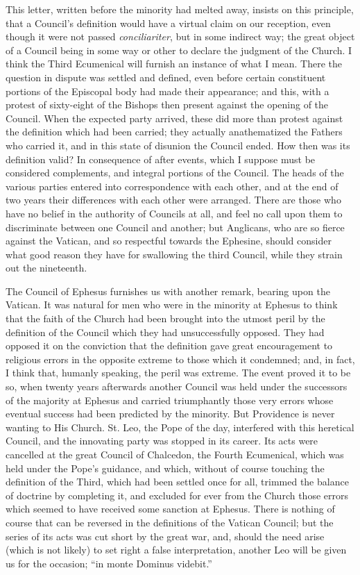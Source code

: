 This letter, written before the minority had melted away, insists on
this principle, that a Council's definition would have a virtual claim
on our reception, even though it were not passed \emph{conciliariter},
but in some indirect way; the great object of a Council being in some
way or other to declare the judgment of the Church. I think the Third
Ecumenical will furnish an instance of what I mean. There the question
in dispute was settled and defined, even before certain constituent
portions of the Episcopal body had made their appearance; and this, with
a protest of sixty-eight of the Bishops then present against the
opening of the Council. When the expected party arrived, these did more
than protest against the definition which had been carried; they
actually anathematized the Fathers who carried it, and in this state of
disunion the Council ended. How then was its definition valid? In
consequence of after events, which I suppose must be considered
complements, and integral portions of the Council. The heads of the
various parties entered into correspondence with each other, and at the
end of two years their differences with each other were arranged. There
are those who have no belief in the authority of Councils at all, and
feel no call upon them to discriminate between one Council and another;
but Anglicans, who are so fierce against the Vatican, and so respectful
towards the Ephesine, should consider what good reason they have for
swallowing the third Council, while they strain out the nineteenth.

The Council of Ephesus furnishes us with another remark, bearing upon
the Vatican. It was natural for men who were in the minority at Ephesus
to think that the faith of the Church had been brought into the utmost
peril by the definition of the Council which they had unsuccessfully
opposed. They had opposed it on the conviction that the definition gave
great encouragement to religious errors in the opposite extreme to those
which it condemned; and, in fact, I think that, humanly speaking, the
peril was extreme. The event proved it to be so, when twenty years
afterwards another Council was held under the successors of the majority
at Ephesus and carried triumphantly those very errors whose eventual
success had been predicted by the minority. But Providence is never wanting to His Church. St. Leo, the Pope of the day, interfered
with this heretical Council, and the innovating party was stopped in its
career. Its acts were cancelled at the great Council of Chalcedon, the
Fourth Ecumenical, which was held under the Pope's guidance, and which,
without of course touching the definition of the Third, which had been
settled once for all, trimmed the balance of doctrine by completing it,
and excluded for ever from the Church those errors which seemed to have
received some sanction at Ephesus. There is nothing of course that can
be reversed in the definitions of the Vatican Council; but the series of
its acts was cut short by the great war, and, should the need arise
(which is not likely) to set right a false interpretation, another Leo
will be given us for the occasion; ``in monte Dominus videbit.''

